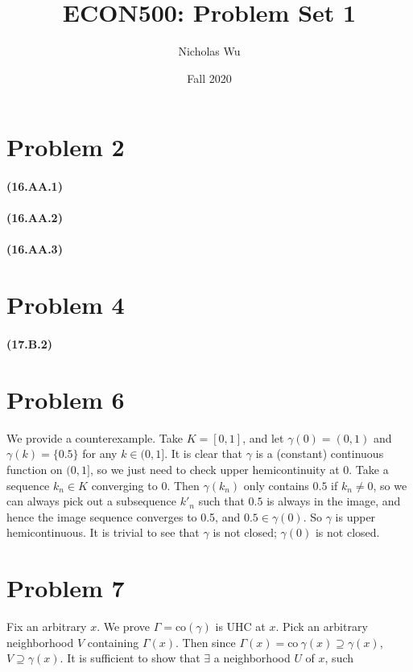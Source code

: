 \documentclass[10pt,letter]{article}
\begin{document}


\title{ECON500: Problem Set 1}

\author{Nicholas Wu}

\date{Fall 2020}

\maketitle


\section*{Problem 2}
\paragraph{(16.AA.1)}
\paragraph{(16.AA.2)}
\paragraph{(16.AA.3)}
\section*{Problem 4}
\paragraph{(17.B.2)}
\section*{Problem 6}
We provide a counterexample. Take $K = [0,1]$, and let $\gamma(0) = (0,1)$ and $\gamma(k) = \{ 0.5 \} $ for any $k \in (0, 1]$. It is clear that $\gamma$ is a (constant) continuous function on $(0,1]$, so we just need to check upper hemicontinuity at 0. Take a sequence $k_n \in K$ converging to 0. Then $\gamma(k_n)$ only contains $0.5$ if $k_n \neq 0$, so we can always pick out a subsequence $k'_n$ such that $0.5$ is always in the image, and hence the image sequence converges to 0.5, and $0.5 \in \gamma(0)$. So $\gamma$ is upper hemicontinuous. It is trivial to see that $\gamma$ is not closed; $\gamma(0)$ is not closed.
\section*{Problem 7}
Fix an arbitrary $x$. We prove $\Gamma = \text{co} (\gamma)$ is UHC at $x$. Pick an arbitrary neighborhood $V$ containing $\Gamma(x)$. Then since $\Gamma(x) = \text{co} \ \gamma(x) \supseteq \gamma(x) $, $V \supseteq \gamma(x)$. It is sufficient to show that $\exists$ a neighborhood $U$ of $x$, such
\end{document}
